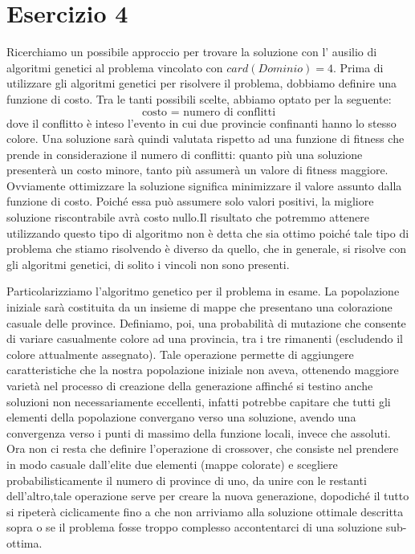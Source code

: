 	\section{Esercizio 4}
		\label{sec:es4}
		Ricerchiamo un possibile approccio per trovare la soluzione con l' ausilio di algoritmi genetici al problema vincolato con $card(Dominio)=4$. Prima di utilizzare gli algoritmi genetici per risolvere il problema, dobbiamo definire una funzione di costo. Tra le tanti possibili scelte, abbiamo optato per la seguente: 
		\begin{equation*}
			\mbox{costo }=\mbox{ numero di conflitti}
		\end{equation*}
		dove il conflitto è inteso l'evento in cui due provincie confinanti hanno lo stesso colore. Una soluzione sarà quindi valutata rispetto ad una funzione di fitness che prende in considerazione il numero di conflitti: quanto più una soluzione presenterà un costo minore, tanto più assumerà un valore di fitness maggiore. Ovviamente ottimizzare la soluzione significa minimizzare il valore assunto dalla funzione di costo. Poiché essa può assumere solo valori positivi, la migliore soluzione riscontrabile avrà costo nullo.Il risultato che potremmo attenere utilizzando questo tipo di algoritmo non è detta che sia ottimo poiché tale tipo di problema che stiamo risolvendo è diverso da quello, che in generale, si risolve con gli algoritmi genetici, di solito i vincoli non sono presenti.\par
		Particolarizziamo l'algoritmo genetico per il problema in esame. La popolazione iniziale sarà costituita da un insieme di mappe che presentano una colorazione casuale delle province. Definiamo, poi, una probabilità di mutazione che consente di variare casualmente colore ad una provincia, tra i tre rimanenti (escludendo il colore attualmente assegnato). Tale operazione permette di aggiungere caratteristiche che la nostra popolazione iniziale non aveva, ottenendo maggiore varietà nel processo di creazione della generazione affinché si testino anche soluzioni non necessariamente eccellenti, infatti potrebbe capitare che tutti gli elementi della popolazione convergano verso una soluzione, avendo una convergenza verso i punti di massimo della funzione locali, invece che assoluti. Ora non ci resta che definire l'operazione di crossover, che consiste nel prendere in modo casuale dall'elite due elementi (mappe colorate) e scegliere probabilisticamente il numero di province di uno, da unire con le restanti dell'altro,tale operazione serve per creare la nuova generazione, dopodiché il tutto si ripeterà ciclicamente fino a che non arriviamo alla soluzione ottimale descritta sopra o se il problema fosse troppo complesso accontentarci di una soluzione sub-ottima.
